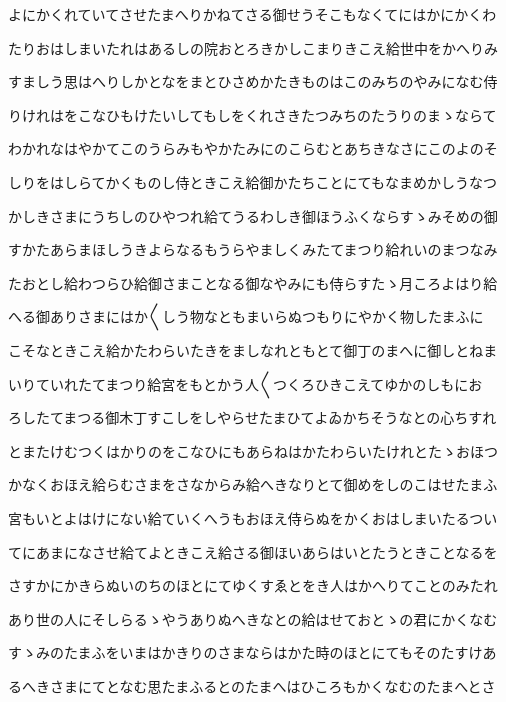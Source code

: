 \documentclass[a4paper,11pt,landscape]{ltjtarticle}
\begin{document}
\par\medskip
よにかくれていてさせたまへりかねてさる御せうそこもなくてにはかにかくわ
\par\medskip
たりおはしまいたれはあるしの院おとろきかしこまりきこえ給世中をかへりみ
\par\medskip
すましう思はへりしかとなをまとひさめかたきものはこのみちのやみになむ侍
\par\medskip
りけれはをこなひもけたいしてもしをくれさきたつみちのたうりのまゝならて
\par\medskip
わかれなはやかてこのうらみもやかたみにのこらむとあちきなさにこのよのそ
\par\medskip
しりをはしらてかくものし侍ときこえ給御かたちことにてもなまめかしうなつ
\par\medskip
かしきさまにうちしのひやつれ給てうるわしき御ほうふくならすゝみそめの御
\par\medskip
すかたあらまほしうきよらなるもうらやましくみたてまつり給れいのまつなみ
\par\medskip
たおとし給わつらひ給御さまことなる御なやみにも侍らすたゝ月ころよはり給
\par\medskip
へる御ありさまにはか〱しう物なともまいらぬつもりにやかく物したまふに
\par\medskip
こそなときこえ給かたわらいたきをましなれともとて御丁のまへに御しとねま
\par\medskip
いりていれたてまつり給宮をもとかう人〱つくろひきこえてゆかのしもにお
\par\medskip
ろしたてまつる御木丁すこしをしやらせたまひてよゐかちそうなとの心ちすれ
\par\medskip
とまたけむつくはかりのをこなひにもあらねはかたわらいたけれとたゝおほつ
\par\medskip
かなくおほえ給らむさまをさなからみ給へきなりとて御めをしのこはせたまふ
\par\medskip
宮もいとよはけにない給ていくへうもおほえ侍らぬをかくおはしまいたるつい
\par\medskip
てにあまになさせ給てよときこえ給さる御ほいあらはいとたうときことなるを
\par\medskip
さすかにかきらぬいのちのほとにてゆくすゑとをき人はかへりてことのみたれ
\par\medskip
あり世の人にそしらるゝやうありぬへきなとの給はせておとゝの君にかくなむ
\par\medskip
すゝみのたまふをいまはかきりのさまならはかた時のほとにてもそのたすけあ
\par\medskip
るへきさまにてとなむ思たまふるとのたまへはひころもかくなむのたまへとさ
\end{document}
